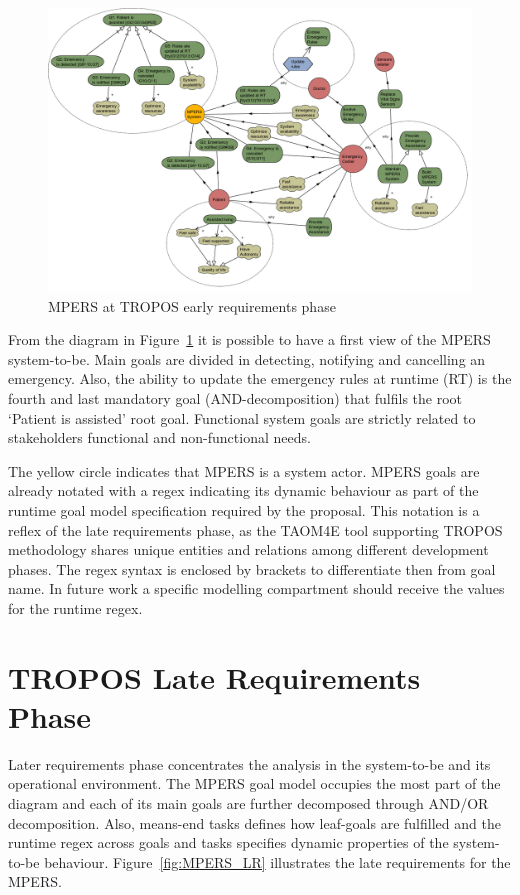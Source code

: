 \begin{figure}[ht]
\centering
\includegraphics[width=1\textwidth]{imgs/MPERS_ER.png}
\caption{MPERS at TROPOS early requirements phase}
\label{fig:MPERS_ER}
\end{figure}

From the diagram in Figure~\ref{fig:MPERS_ER} it is possible to have a first view of the MPERS system-to-be. Main goals are divided in detecting, notifying and cancelling an emergency. Also, the ability to update the emergency rules at runtime (RT) is the fourth and last mandatory goal (AND-decomposition) that fulfils the root `Patient is assisted' root goal. Functional system goals are strictly related to stakeholders functional and non-functional needs.

The yellow circle indicates that MPERS is a system actor. MPERS goals are already notated with a regex indicating its dynamic behaviour as part of the runtime goal model specification required by the proposal. This notation is a reflex of the late requirements phase, as the TAOM4E tool supporting TROPOS methodology shares unique entities and relations among different development phases. The regex syntax is enclosed by brackets to differentiate then from goal name. In future work a specific modelling compartment should receive the values for the runtime regex.

\section{TROPOS Late Requirements Phase}

Later requirements phase concentrates the analysis in the system-to-be and its operational environment. The MPERS goal model occupies the most part of the diagram and each of its main goals are further decomposed through AND/OR decomposition. Also, means-end tasks defines how leaf-goals are fulfilled and the runtime regex across goals and tasks specifies dynamic properties of the system-to-be behaviour. Figure~\ref{fig:MPERS_LR} illustrates the late requirements for the MPERS.

